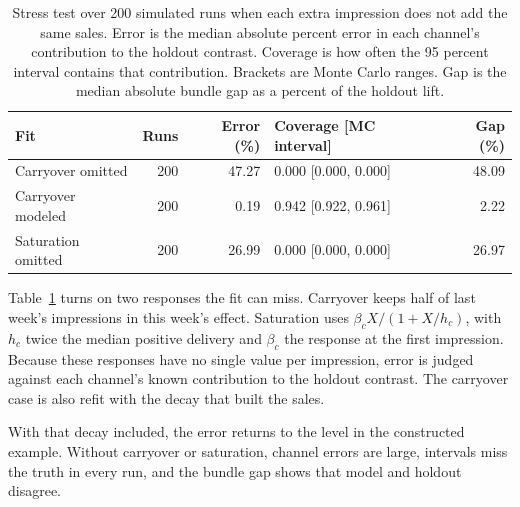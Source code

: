 \documentclass[preprint,12pt]{elsarticle}
\begin{document}
\begin{table}[H]
\centering
\caption{Stress test over 200 simulated runs when each extra impression does not add the same sales. Error is the median absolute percent error in each channel's contribution to the holdout contrast. Coverage is how often the 95 percent interval contains that contribution. Brackets are Monte Carlo ranges. Gap is the median absolute bundle gap as a percent of the holdout lift.}
\label{tab:stress}
\small
\setlength{\tabcolsep}{4pt}
\begin{tabular}{lrrlr}
\toprule
Fit & Runs & Error (\%) & Coverage [MC interval] & Gap (\%) \\
\midrule
Carryover omitted & 200 & 47.27 & 0.000 [0.000, 0.000] & 48.09 \\
Carryover modeled & 200 & 0.19 & 0.942 [0.922, 0.961] & 2.22 \\
Saturation omitted & 200 & 26.99 & 0.000 [0.000, 0.000] & 26.97 \\
\bottomrule
\end{tabular}
\end{table}

Table~\ref{tab:stress} turns on two responses the fit can miss. Carryover keeps half of last week's impressions in this week's effect. Saturation uses $\beta_c X/(1+X/h_c)$, with $h_c$ twice the median positive delivery and $\beta_c$ the response at the first impression. Because these responses have no single value per impression, error is judged against each channel's known contribution to the holdout contrast. The carryover case is also refit with the decay that built the sales.

With that decay included, the error returns to the level in the constructed example. Without carryover or saturation, channel errors are large, intervals miss the truth in every run, and the bundle gap shows that model and holdout disagree.
\end{document}

